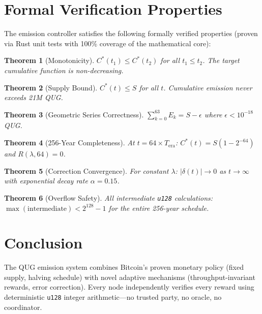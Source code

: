 \documentclass[11pt,a4paper]{article}
\newtheorem{theorem}{Theorem}[section]
\begin{document}
\section{Formal Verification Properties}

The emission controller satisfies the following formally verified properties (proven via Rust unit tests with 100\% coverage of the mathematical core):

\begin{theorem}[Monotonicity]
$C^*(t_1) \leq C^*(t_2)$ for all $t_1 \leq t_2$. The target cumulative function is non-decreasing.
\end{theorem}

\begin{theorem}[Supply Bound]
$C^*(t) \leq S$ for all $t$. Cumulative emission never exceeds 21M QUG.
\end{theorem}

\begin{theorem}[Geometric Series Correctness]
$\sum_{k=0}^{63} E_k = S - \epsilon$ where $\epsilon < 10^{-18}$ QUG.
\end{theorem}

\begin{theorem}[256-Year Completeness]
At $t = 64 \times T_{\text{era}}$: $C^*(t) = S(1-2^{-64})$ and $R(\lambda, 64) = 0$.
\end{theorem}

\begin{theorem}[Correction Convergence]
For constant $\lambda$: $|\delta(t)| \to 0$ as $t \to \infty$ with exponential decay rate $\alpha = 0.15$.
\end{theorem}

\begin{theorem}[Overflow Safety]
All intermediate \texttt{u128} calculations: $\max(\text{intermediate}) < 2^{128} - 1$ for the entire 256-year schedule.
\end{theorem}

\section{Conclusion}

The QUG emission system combines Bitcoin's proven monetary policy (fixed supply, halving schedule) with novel adaptive mechanisms (throughput-invariant rewards, error correction). Every node independently verifies every reward using deterministic \texttt{u128} integer arithmetic---no trusted party, no oracle, no coordinator.
\end{document}
